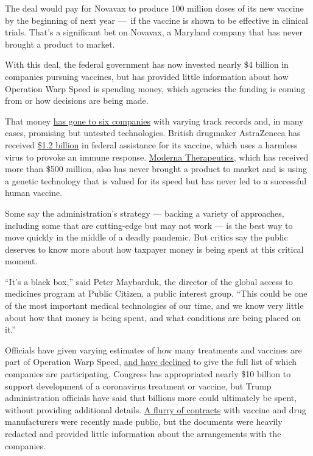 The deal would pay for Novavax to produce 100 million doses of its new
vaccine by the beginning of next year ---~if the vaccine is shown to be
effective in clinical trials. That's a significant bet on Novavax, a
Maryland company that has never brought a product to market.

With this deal, the federal government has now invested nearly \$4
billion in companies pursuing vaccines, but has provided little
information about how Operation Warp Speed is spending money, which
agencies the funding is coming from or how decisions are being made.

That money
\href{https://medicalcountermeasures.gov/app/barda/coronavirus/COVID19.aspx}{has
gone to six companies} with varying track records and, in many cases,
promising but untested technologies. British drugmaker AstraZeneca has
received
\href{https://www.nytimes3xbfgragh.onion/2020/05/21/health/coronavirus-vaccine-astrazeneca.html}{\$1.2
billion} in federal assistance for its vaccine, which uses a harmless
virus to provoke an immune response.
\href{https://www.nytimes3xbfgragh.onion/2020/05/23/health/coronavirus-vaccine-moderna.html}{Moderna
Therapeutics}, which has received more than \$500 million, also has
never brought a product to market and is using a genetic technology that
is valued for its speed but has never led to a successful human vaccine.

Some say the administration's strategy --- backing a variety of
approaches, including some that are cutting-edge but may not work --- is
the best way to move quickly in the middle of a deadly pandemic. But
critics say the public deserves to know more about how taxpayer money is
being spent at this critical moment.

``It's a black box,'' said Peter Maybarduk, the director of the global
access to medicines program at Public Citizen, a public interest group.
``This could be one of the most important medical technologies of our
time, and we know very little about how that money is being spent, and
what conditions are being placed on it.''

Officials have given varying estimates of how many treatments and
vaccines are part of Operation Warp Speed,
\href{https://www.sciencemag.org/news/2020/07/operation-warp-speed-s-opaque-choices-covid-19-vaccines-draw-senate-scrutiny}{and
have declined} to give the full list of which companies are
participating. Congress has appropriated nearly \$10 billion to support
development of a coronavirus treatment or vaccine, but Trump
administration officials have said that billions more could ultimately
be spent, without providing additional details.
\href{https://www.keionline.org/covid19-ota-contracts}{A flurry of
contracts} with vaccine and drug manufacturers were recently made
public, but the documents were heavily redacted and provided little
information about the arrangements with the companies.

